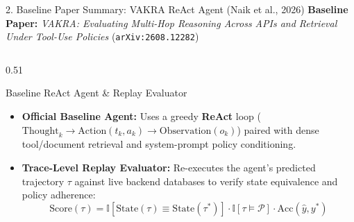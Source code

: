 \documentclass[aspectratio=169, 10pt]{beamer}
\begin{document}
\begin{frame}{2. Baseline Paper Summary: VAKRA ReAct Agent (Naik et al., 2026)}
{\footnotesize \textbf{Baseline Paper:} \textit{VAKRA: Evaluating Multi-Hop Reasoning Across APIs and Retrieval Under Tool-Use Policies} (\texttt{arXiv:2608.12282})}

\vspace{0.08cm}
\begin{columns}[T, onlytextwidth]
\begin{column}{0.51\textwidth}
\begin{block}{\small Baseline ReAct Agent \& Replay Evaluator}
\scriptsize
\begin{itemize}
    \setlength{\itemsep}{2pt}
    \item \textbf{Official Baseline Agent:} Uses a greedy \textbf{ReAct} loop ($\text{Thought}_k \rightarrow \text{Action}(t_k, a_k) \rightarrow \text{Observation}(o_k)$) paired with dense tool/document retrieval and system-prompt policy conditioning.
    \item \textbf{Trace-Level Replay Evaluator:} Re-executes the agent's predicted trajectory $\tau$ against live backend databases to verify state equivalence and policy adherence:
    $$\text{Score}(\tau) = \mathbb{I}[\text{State}(\tau)\equiv\text{State}(\tau^*)] \cdot \mathbb{I}[\tau \models \mathcal{P}] \cdot \text{Acc}(\hat{y}, y^*)$$
\end{itemize}
\end{block}
\end{column}


\end{columns}
\end{frame}
\end{document}
